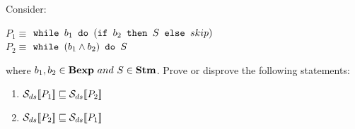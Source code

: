 \newcommand{\and}{\wedge}

\newcommand{\exEightA}
{$ \wbS{b_1}{(\ifABC{b_2}{S}{skip})} $}

\newcommand{\exEightB}
{$  \wbS{(b_1 \and b_2)}{S} $}

\newcommand{\Sds}{\dsCtxt{S}}
\newcommand{\mineq}{\sqsubseteq}
\newcommand{\notmineq}{\not\sqsubseteq}

{
    Consider: 
    \begin{center}
    $ P_1 \equiv $ \exEightA \\
    $ P_2 \equiv $ \exEightB
    \end{center}
    where $ b_1, b_2 \in\mbox{\textbf{Bexp}}~and~S\in\mbox{\textbf{Stm}}$. Prove or disprove the following
    statements: 
    \begin{enumerate}
    \item $\dsCtxt{P_1} \mineq \dsCtxt{P_2}$
    \item $\dsCtxt{P_2} \mineq \dsCtxt{P_1}$
    \end{enumerate}
}
